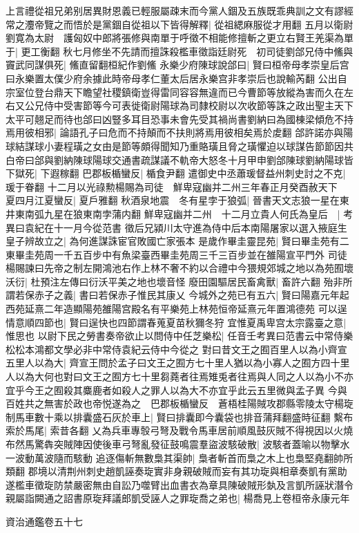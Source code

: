 上言禮從祖兄弟别居異財恩義已輕服屬疎末而今黨人錮及五族既乖典訓之文有謬經常之灋帝覽之而悟於是黨錮自從祖以下皆得解釋|{
	從祖緦麻服從才用翻}
五月以衛尉劉寛為太尉　護匈奴中郎將張修與南單于呼徵不相能修擅斬之更立右賢王羌渠為單于|{
	更工衡翻}
秋七月修坐不先請而擅誅殺檻車徵詣廷尉死　初司徒劉郃兄侍中鯈與竇武同謀俱死|{
	鯈直留翻桓紀作劉鯈}
永樂少府陳球說郃曰|{
	賢曰桓帝母孝崇皇后宫曰永樂置太僕少府余據此時帝母孝仁董太后居永樂宫非孝崇后也說輸芮翻}
公出自宗室位登台鼎天下瞻望社稷鎮衛豈得雷同容容無違而已今曹節等放縱為害而久在左右又公兄侍中受害節等今可表徙衛尉陽球為司隸校尉以次收節等誅之政出聖主天下太平可翹足而待也郃曰凶豎多耳目恐事未會先受其禍尚書劉納曰為國棟梁傾危不持焉用彼相邪|{
	論語孔子曰危而不持顛而不扶則將焉用彼相矣焉於䖍翻}
郃許諾亦與陽球結謀球小妻程璜之女由是節等頗得聞知乃重賂璜且脅之璜懼迫以球謀告節節因共白帝曰郃與劉納陳球陽球交通書疏謀議不軌帝大怒冬十月甲申劉郃陳球劉納陽球皆下獄死|{
	下遐稼翻}
巴郡板楯蠻反|{
	楯食尹翻}
遣御史中丞蕭瑗督益州刺史討之不克|{
	瑗于眷翻}
十二月以光祿勲楊賜為司徒　鮮卑寇幽并二州三年春正月癸酉赦天下　夏四月江夏蠻反|{
	夏戶雅翻}
秋酒泉地震　冬有星孛于狼弧|{
	晉書天文志狼一星在東井東南弧九星在狼東南孛蒲内翻}
鮮卑寇幽并二州　十二月立貴人何氏為皇后　|{
	考異曰袁紀在十一月今從范書}
徵后兄潁川太守進為侍中后本南陽屠家以選入掖庭生皇子辨故立之|{
	為何進謀誅宦官敗國亡家張本}
是歲作畢圭靈昆苑|{
	賢曰畢圭苑有二東畢圭苑周一千五百步中有魚梁臺西畢圭苑周三千三百步並在雒陽宣平門外}
司徒楊賜諫曰先帝之制左開鴻池右作上林不奢不約以合禮中今猥規郊城之地以為苑囿壞沃衍|{
	杜預注左傳曰衍沃平美之地也壞音怪}
廢田園驅居民畜禽獸|{
	畜許六翻}
殆非所謂若保赤子之義|{
	書曰若保赤子惟民其康乂}
今城外之苑已有五六|{
	賢曰陽嘉元年起西苑延熹二年造顯陽苑雒陽宫殿名有平樂苑上林苑恒帝延熹元年置鴻德苑}
可以逞情意順四節也|{
	賢曰逞快也四節謂春蒐夏苗秋獮冬狩}
宜惟夏禹卑宫太宗露臺之意|{
	惟思也}
以尉下民之勞書奏帝欲止以問侍中任芝樂松|{
	任音壬考異曰范書云中常侍樂松松本鴻都文學必非中常侍袁紀云侍中今從之}
對曰昔文王之囿百里人以為小齊宣五里人以為大|{
	齊宣王問於孟子曰文王之囿方七十里人猶以為小寡人之囿方四十里人以為大何也對曰文王之囿方七十里芻蕘者往焉雉兎者往焉與人同之人以為小不亦宜乎今王之囿殺其麋鹿者如殺人之罪人以為大不亦宜乎此云五里微與孟子異}
今與百姓共之無害於政也帝悦遂為之　巴郡板楯蠻反　蒼梧桂陽賊攻郡縣零陵太守楊琁制馬車數十乘以排囊盛石灰於車上|{
	賢曰排囊即今囊袋也排音蒲拜翻盛時征翻}
繫布索於馬尾|{
	索昔各翻}
乂為兵車專彀弓弩及戰令馬車居前順風鼓灰賊不得視因以火燒布然馬驚犇突賊陣因使後車弓弩亂發征鼓鳴震羣盜波駭破散|{
	波駭者蓋喻以物擊水一波動萬波隨而駭動}
追逐傷斬無數梟其渠帥|{
	梟者斬首而梟之木上也梟堅堯翻帥所類翻}
郡境以清荆州刺史趙凱誣奏琁實非身親破賊而妄有其功琁與相章奏凱有黨助遂檻車徵琁防禁嚴密無由自訟乃噬臂出血書衣為章具陳破賊形埶及言凱所誣狀潛令親屬詣闕通之詔書原琁拜議郎凱受誣人之罪琁喬之弟也|{
	楊喬見上卷桓帝永康元年}


資治通鑑卷五十七
